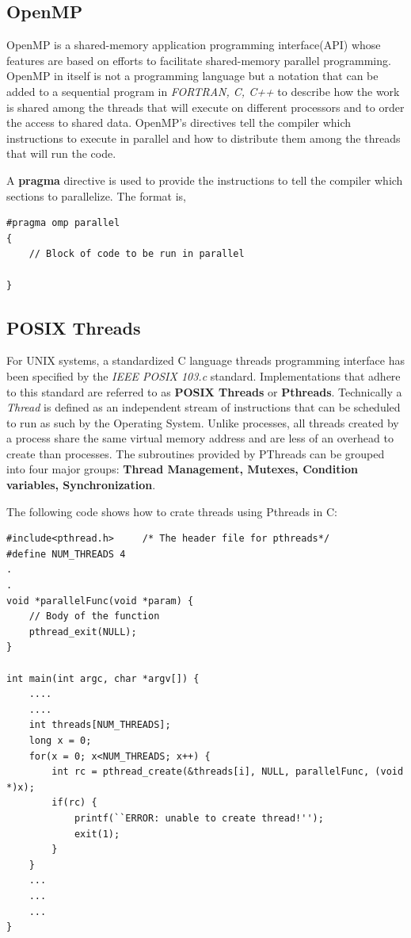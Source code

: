 \documentclass{article}
\begin{document}
\subsection{OpenMP}
OpenMP is a shared-memory application programming interface(API) whose features are based on efforts to 
facilitate shared-memory parallel programming. OpenMP in itself is not a programming language but a notation 
that can be added to a sequential program in \textit{FORTRAN, C, C++} to describe how the work is shared 
among the threads that will execute on different processors and to order the access to shared data.
OpenMP's directives tell the compiler which instructions to execute in parallel and how to distribute them 
among the threads that will run the code.

A \textbf{pragma} directive is used to provide the instructions to tell the compiler which sections to parallelize.
The format is,
\begin{lstlisting}
#pragma omp parallel
{
	// Block of code to be run in parallel

}
\end{lstlisting}

\subsection{POSIX Threads}
For UNIX systems, a standardized C language threads programming interface has been specified by the \textit{IEEE POSIX 103.c}
standard. Implementations that adhere to this standard are referred to as \textbf{POSIX Threads} or \textbf{Pthreads}.
Technically a \textit{Thread} is defined as an independent stream of instructions that can be scheduled to run as such by the 
Operating System. Unlike processes, all threads created by a process share the same virtual memory address and are less of an
overhead to create than processes.  The subroutines provided by PThreads can be grouped into four major groups: \textbf{Thread Management, Mutexes, Condition variables, Synchronization}.  

The following code shows how to crate threads using Pthreads in C:
\begin{lstlisting}
#include<pthread.h> 	/* The header file for pthreads*/
#define NUM_THREADS 4
.
.
void *parallelFunc(void *param) {
	// Body of the function
	pthread_exit(NULL);
}

int main(int argc, char *argv[]) {
	....
	....
	int threads[NUM_THREADS];
	long x = 0;
	for(x = 0; x<NUM_THREADS; x++) {
		int rc = pthread_create(&threads[i], NULL, parallelFunc, (void *)x);
		if(rc) {
			printf(``ERROR: unable to create thread!'');
			exit(1);
		}
	}
	...
	...
	...
}
\end{lstlisting}
\pagebreak
\end{document}
